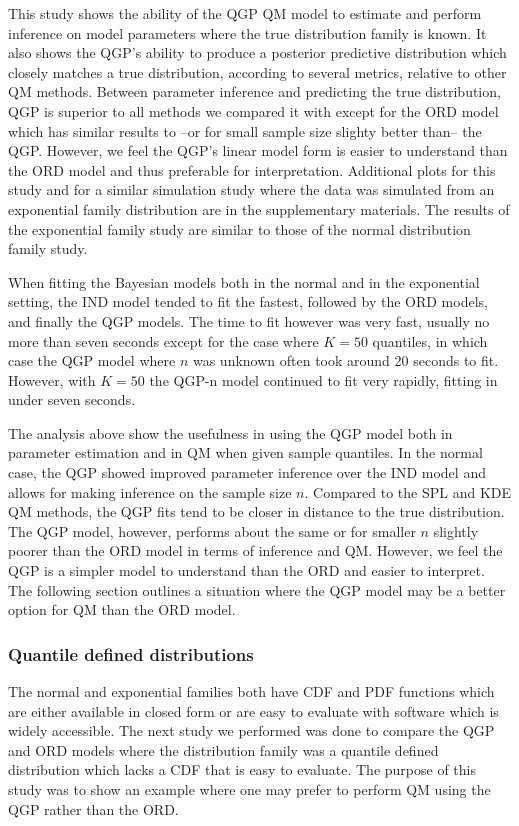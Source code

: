 \documentclass[preprint,12pt,authoryear]{elsarticle}
\newcommand{\1}[1]{\mathds{1}\left[#1\right]}
\begin{document}
This study shows the ability of the QGP QM model to estimate and perform 
inference on model parameters where the true distribution family is known. It 
also shows the QGP's ability to produce a posterior predictive distribution 
which closely matches a true distribution, according to several metrics, 
relative to other QM methods. Between parameter inference and predicting the 
true distribution, QGP is superior to all methods we compared it with except 
for the ORD model which has similar results to --or for small sample size
slighty better than-- the QGP. However, we feel the QGP's linear model form is
easier to understand than the ORD model and thus preferable for interpretation.
Additional plots for this study and for a similar simulation 
study where the data was simulated from an exponential family distribution are 
in the supplementary materials.
The results of the exponential family study are similar to those of the 
normal distribution family study.




When fitting the Bayesian models both in the normal and in the exponential 
setting, the IND model tended to fit the fastest, followed by the ORD models, 
and finally the QGP models. The time to fit however was very fast, usually no 
more than seven seconds except for the case where $K = 50$ quantiles, in which 
case the QGP model where $n$ was unknown often took around 20 seconds to fit. 
However, with $K= 50$ the QGP-n model continued to fit very rapidly, fitting in 
under seven seconds.

The analysis above show the usefulness in using the QGP model both in parameter 
estimation and in QM when given sample quantiles. In the normal case, the QGP 
showed improved parameter inference over the IND model and allows for making 
inference on the sample size $n$. Compared to the SPL and KDE QM methods, the 
QGP fits tend to be closer in distance to the true distribution. The QGP model, 
however, performs about the same or for smaller $n$ slightly poorer than the
ORD model in terms of inference and QM. However, we feel the QGP is a simpler
model to
understand than the ORD and easier to interpret.
The following section outlines a situation where the QGP model may be a better 
option for QM than the ORD model. 


\subsubsection{Quantile defined distributions}
The normal and exponential families both have CDF and PDF functions which are 
either available in closed form or are easy to evaluate with software which is 
widely accessible. The next study we performed was done to compare the QGP and 
ORD models where the distribution family was a quantile defined distribution 
which lacks a CDF that is easy to evaluate. The purpose of this study was to 
show an example where one may prefer to perform QM using the QGP rather than 
the ORD.
\end{document}

